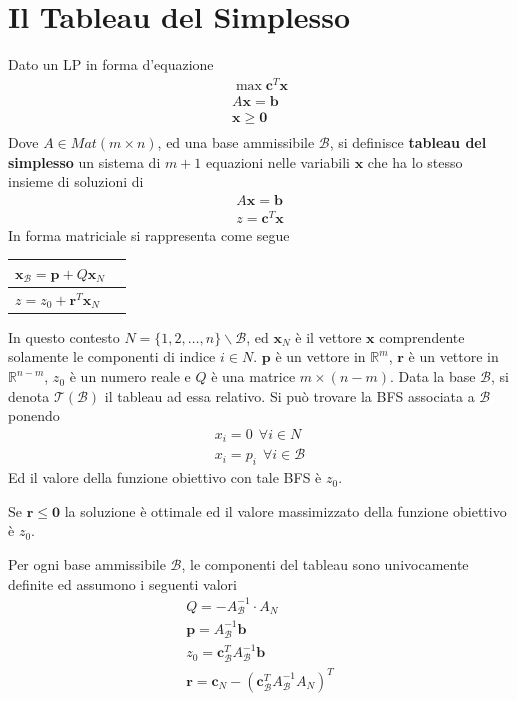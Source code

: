 \documentclass[10pt, letterpaper]{report}
\begin{document}
\section{Il Tableau del Simplesso}
\begin{definizione}
    Dato un LP in forma d'equazione
    $$\begin{matrix}
    \max \mathbf{c}^T \mathbf x  \\ 
    A\mathbf x = \mathbf b \\
    \mathbf x \ge \mathbf 0 \\ 
\end{matrix}$$
Dove $A\in Mat(m\times n)$, ed una base ammissibile $\mathcal B$, si definisce \textbf{tableau del simplesso} un sistema di $m+1$ equazioni nelle variabili $\mathbf x$ che ha lo stesso insieme di soluzioni di 
$$\begin{matrix}
    A\mathbf x = \mathbf b \\
    z=\mathbf c^T\mathbf x
\end{matrix}$$
In forma matriciale si rappresenta come segue 
\begin{center}
    \begin{tabular}{|l|l|}\hline 
       $\mathbf{x}_\mathcal{B} = \mathbf p + Q\mathbf x_N$\\ \hline 
       $z=z_0+\mathbf r^T\mathbf x_N$ \\\hline 
    \end{tabular}
\end{center}
\end{definizione}
In questo contesto $N=\{1,2,\dots, n\}\backslash \mathcal B$, ed $\mathbf x_N$ è il vettore $\mathbf x$ comprendente solamente le componenti di indice $i\in N$. $\mathbf p$ è un vettore in $\mathbb R^m$, $\mathbf r$ è un vettore in $\mathbb R^{n-m}$, $z_0$ è un numero reale e $Q$ è una matrice $m\times(n-m)$. Data la base $\mathcal B$, si denota $\mathcal T(\mathcal B)$ il tableau ad essa relativo. Si può trovare la BFS associata a $\mathcal B$ ponendo 
\begin{eqnarray*}
    x_i=0  \ \ \forall i\in  N\\ 
    x_i=p_i  \ \ \forall i\in \mathcal B
\end{eqnarray*}
Ed il valore della funzione obiettivo con tale BFS è $z_0$.
\begin{osservazione}
    Se $\mathbf r \le \mathbf 0$ la soluzione è ottimale ed il valore massimizzato della funzione obiettivo è $z_0$.
\end{osservazione}
\begin{lemma2}\label{lemma_tableau}
    Per ogni base ammissibile $\mathcal B$, le componenti del tableau sono univocamente definite ed assumono i seguenti valori \begin{eqnarray}
        Q=-A_\mathcal{B}^{-1}\cdot A_N\\ 
        \mathbf p =A_\mathcal{B}^{-1}\mathbf b \\ 
        z_0=\mathbf c^T_{\mathcal B}A_\mathcal{B}^{-1}\mathbf b\\ 
        \mathbf r = \mathbf c_N - (\mathbf c_\mathcal{B}^TA_\mathcal{B}^{-1}A_N)^T
    \end{eqnarray}
\end{lemma2}
\end{document}
